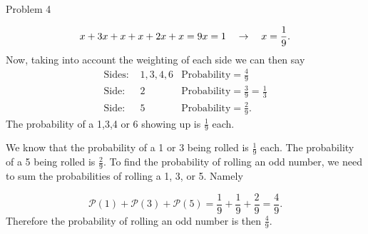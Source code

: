 \begin{problem}{Problem 4}
\begin{Highlight}
        \setcounter{equation}{0}
        \begin{equation}
            x + 3x + x + x + 2x + x = 9x = 1 \hspace*{10pt} \rightarrow \hspace*{10pt} x = \frac{1}{9}.
        \end{equation}
        Now, taking into account the weighting of each side we can then say
        \begin{align}
            \text{Sides: } & 1,3,4,6 & \text{Probability} =  \frac{4}{9} \\
            \text{Side: } & 2 & \text{Probability} =  \frac{3}{9} = \frac{1}{3} \\
            \text{Side: } & 5 & \text{Probability} =  \frac{2}{9}.
        \end{align}
        The probability of a 1,3,4 or 6 showing up is $\frac{1}{9}$ each.
    \end{Highlight}

    \begin{Highlight}
        We know that the probability of a 1 or 3 being rolled is $\frac{1}{9}$ each. The probability of a 5 being rolled is $\frac{2}{9}$. To find the probability of rolling an odd number, we need to 
        sum the probabilities of rolling a 1, 3, or 5. Namely

        \begin{equation}
            \mathcal{P}(1) + \mathcal{P}(3) + \mathcal{P}(5) = \frac{1}{9} + \frac{1}{9} + \frac{2}{9} = \frac{4}{9}.
        \end{equation}
        Therefore the probability of rolling an odd number is then $\frac{4}{9}$.
    \end{Highlight}
\end{problem}

